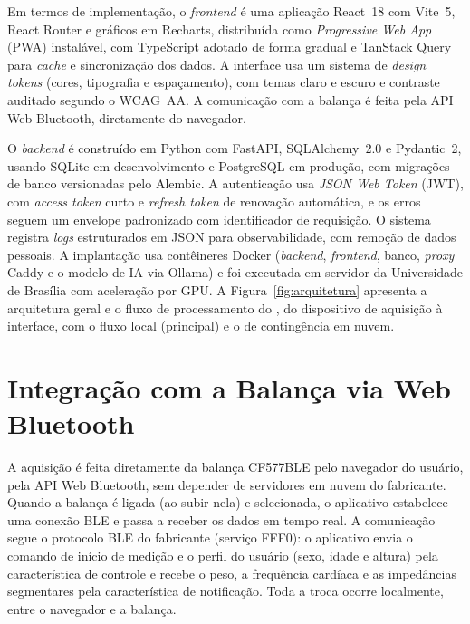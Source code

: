 Em termos de implementação, o \emph{frontend} é uma aplicação React~18 com Vite~5, React
Router e gráficos em Recharts, distribuída como \emph{Progressive Web App} (PWA)
instalável, com TypeScript adotado de forma gradual e TanStack Query para \emph{cache} e
sincronização dos dados. A interface usa um sistema de \emph{design tokens} (cores,
tipografia e espaçamento), com temas claro e escuro e contraste auditado segundo o WCAG~AA.
A comunicação com a balança é feita pela API Web Bluetooth, diretamente do navegador.

O \emph{backend} é construído em Python com FastAPI, SQLAlchemy~2.0 e Pydantic~2, usando
SQLite em desenvolvimento e PostgreSQL em produção, com migrações de banco versionadas pelo
Alembic. A autenticação usa \emph{JSON Web Token} (JWT), com \emph{access token} curto e
\emph{refresh token} de renovação automática, e os erros seguem um envelope padronizado com
identificador de requisição. O sistema registra \emph{logs} estruturados em JSON para
observabilidade, com remoção de dados pessoais. A implantação usa contêineres Docker
(\emph{backend}, \emph{frontend}, banco, \emph{proxy} Caddy e o modelo de IA via Ollama) e
foi executada em servidor da Universidade de Brasília com aceleração por GPU. A
Figura~\ref{fig:arquitetura} apresenta a arquitetura geral e o fluxo de processamento do
\sintonia, do dispositivo de aquisição à interface, com o fluxo local (principal) e o de
contingência em nuvem.


\section{Integração com a Balança via Web Bluetooth}

A aquisição é feita diretamente da balança CF577BLE pelo navegador do usuário, pela API Web
Bluetooth, sem depender de servidores em nuvem do fabricante. Quando a balança é ligada (ao
subir nela) e selecionada, o aplicativo estabelece uma conexão BLE e passa a receber os
dados em tempo real. A comunicação segue o protocolo BLE do fabricante (serviço FFF0): o
aplicativo envia o comando de início de medição e o perfil do usuário (sexo, idade e
altura) pela característica de controle e recebe o peso, a frequência cardíaca e as
impedâncias segmentares pela característica de notificação. Toda a troca ocorre localmente,
entre o navegador e a balança.


